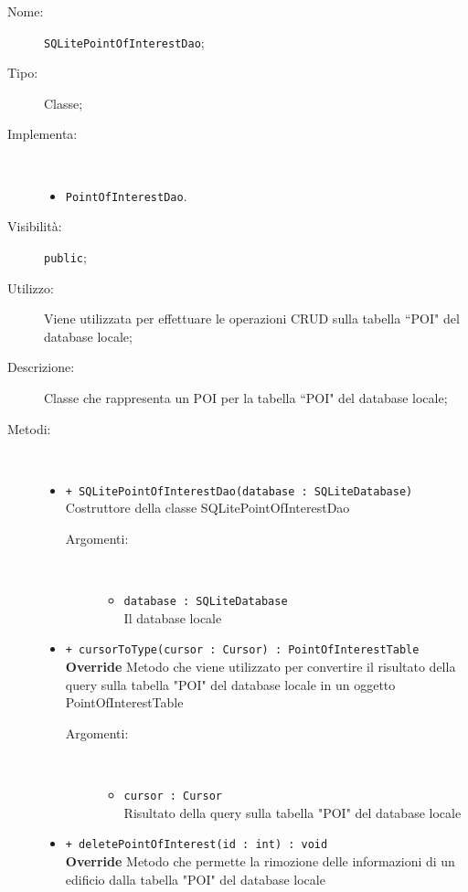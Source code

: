 \documentclass[../DefinizioneDiProdotto.tex]{subfiles}
\begin{document}
\begin{description}
	\item[Nome:] \texttt{SQLitePointOfInterestDao};
	\item[Tipo:] Classe;
	\item[Implementa:] \
	\begin{itemize}
		\item \texttt{PointOfInterestDao}.
		
	\end{itemize}
	\item[Visibilità:] \texttt{public};
	\item[Utilizzo:] Viene utilizzata per effettuare le operazioni CRUD sulla tabella “POI" del database locale;
	\item[Descrizione:] Classe che rappresenta un POI per la tabella “POI" del database locale;
	\item[Metodi:] \
	\begin{itemize}
		\item \texttt{+ SQLitePointOfInterestDao(database : SQLiteDatabase)}\\
		Costruttore della classe SQLitePointOfInterestDao
		\begin{description}
			\item[Argomenti:] \
			\begin{itemize}
				\item \texttt{database : SQLiteDatabase}\\
				Il database locale\end{itemize}
		\end{description}
		\item \texttt{+ cursorToType(cursor : Cursor) : PointOfInterestTable}\\
		\textbf{Override} Metodo che viene utilizzato per convertire il risultato della query sulla tabella "POI" del database locale in un oggetto PointOfInterestTable
		\begin{description}
			\item[Argomenti:] \
			\begin{itemize}
				\item \texttt{cursor : Cursor}\\
				Risultato della query sulla tabella "POI" del database locale\end{itemize}
		\end{description}
		\item \texttt{+ deletePointOfInterest(id : int) : void}\\
		\textbf{Override} Metodo che permette la rimozione delle informazioni di un edificio dalla tabella "POI" del database locale 

\end{itemize}
\end{description}
\end{document}
